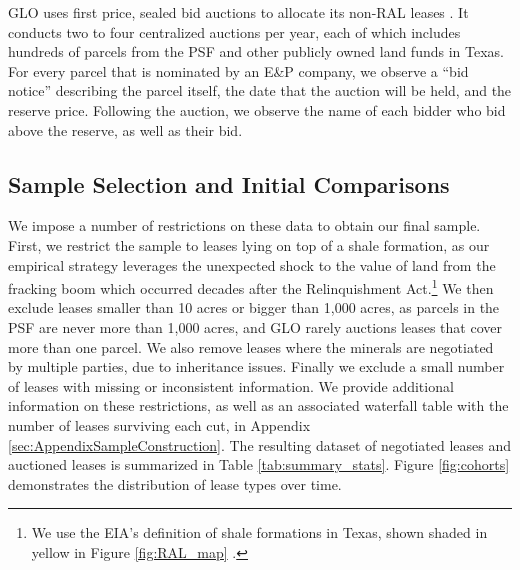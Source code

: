 GLO uses first price, sealed bid auctions to allocate its non-RAL leases \citep{auctiondata}. It conducts two to four centralized auctions per year, each of which includes hundreds of parcels from the PSF and other publicly owned land funds in Texas. For every parcel that is nominated by an E\&P company, we observe a ``bid notice'' describing the parcel itself, the date that the auction will be held, and the reserve price.  Following the auction, we observe the name of each bidder who bid above the reserve, as well as their bid.  

\subsection{Sample Selection and Initial Comparisons}\label{sec:sampleSelection}
We impose a number of restrictions on these data to obtain our final sample. First, we restrict the sample to leases lying on top of a shale formation, as our empirical strategy leverages the unexpected shock to the value of land from the fracking boom which occurred decades after the Relinquishment Act.\footnote{We use the EIA's definition of shale formations in Texas, shown shaded in yellow in Figure \ref{fig:RAL_map} \citep{eiaboundaries,eiathicknessef,eiathicknesspm}.} We then exclude leases smaller than 10 acres or bigger than 1,000 acres, as parcels in the PSF are never more than 1,000 acres, and GLO rarely auctions leases that cover more than one parcel. We also remove leases where the minerals are negotiated by multiple parties, due to inheritance issues. Finally we exclude a small number of leases with missing or inconsistent information. We provide additional information on these restrictions, as well as an associated waterfall table with the number of leases surviving each cut, in Appendix \ref{sec:AppendixSampleConstruction}. The resulting dataset of  negotiated leases and  auctioned leases is summarized in Table \ref{tab:summary_stats}. Figure \ref{fig:cohorts} demonstrates the distribution of lease types over time.  

